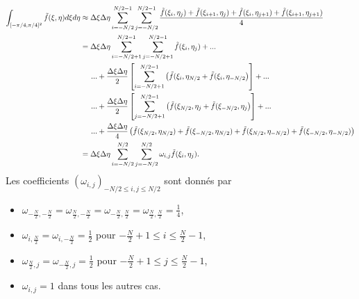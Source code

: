 \begin{align*}
\displaystyle\int_{[-\pi/4,\pi/4]^2} \tilde{f}(\xi, \eta) d\xi d\eta & \approx \Delta \xi \Delta \eta \displaystyle\sum\limits_{i=-N/2}^{N/2-1} \displaystyle\sum\limits_{j=-N/2}^{N/2-1} \dfrac{\tilde{f}(\xi_{i}, \eta_{j}) + \tilde{f}(\xi_{i+1}, \eta_{j}) + \tilde{f}(\xi_{i}, \eta_{j+1}) + \tilde{f}(\xi_{i+1}, \eta_{j+1}) }{4} \\
	& = \Delta \xi \Delta \eta \displaystyle\sum\limits_{i = -N/2+1}^{N/2-1} \displaystyle\sum\limits_{j = -N/2+1}^{N/2-1} \tilde{f}(\xi_i, \eta_j) + ... \\
	& \hspace{5mm} ... + \dfrac{\Delta \xi \Delta \eta}{2} \left[ \displaystyle\sum\limits_{i=-N/2+1}^{N/2-1} \left( \tilde{f}(\xi_i, \eta_{N/2} + \tilde{f}(\xi_i, \eta_{-N/2} \right) \right] + ...\\
	& \hspace{5mm} ... + \dfrac{\Delta \xi \Delta \eta}{2} \left[ \displaystyle\sum\limits_{j=-N/2+1}^{N/2-1} \left( \tilde{f}(\xi_{N/2}, \eta_{j} + \tilde{f}(\xi_{-N/2}, \eta_{j} \right) \right]+ ... \\
	& \hspace{5mm} ... + \dfrac{\Delta \xi \Delta \eta}{4} \left( \tilde{f}(\xi_{N/2}, \eta_{N/2}) + \tilde{f}(\xi_{-N/2}, \eta_{N/2}) + \tilde{f}(\xi_{N/2}, \eta_{-N/2})+ \tilde{f}(\xi_{-N/2}, \eta_{-N/2}) \right)\\
	& = \Delta \xi \Delta \eta \displaystyle\sum\limits_{i=-N/2}^{N/2} \displaystyle\sum\limits_{j=-N/2}^{N/2} \omega_{i,j} \tilde{f}(\xi_i, \eta_j).
\end{align*}
Les coefficients $(\omega_{i,j})_{-N/2 \leq i,j \leq N/2}$ sont donnés par
\begin{itemize}
\item $\omega_{-\frac{N}{2},-\frac{N}{2}}=\omega_{\frac{N}{2},-\frac{N}{2}}=\omega_{-\frac{N}{2},\frac{N}{2}}=\omega_{\frac{N}{2},\frac{N}{2}}=\frac{1}{4}$,
\item $\omega_{i,\frac{N}{2}}=\omega_{i,-\frac{N}{2}}=\frac{1}{2}$ pour $-\frac{N}{2}+1 \leq i \leq \frac{N}{2}-1$,
\item $\omega_{\frac{N}{2},j}=\omega_{-\frac{N}{2},j}=\frac{1}{2}$ pour $-\frac{N}{2}+1 \leq j \leq \frac{N}{2}-1$,
\item $\omega_{i,j}=1$ dans tous les autres cas.
\end{itemize}

